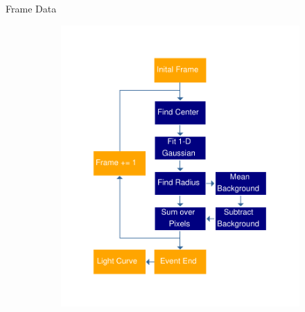 \documentclass[final]{beamer}
\newlength{\twocolwid}
\begin{document}
\begin{frame}[t]
\begin{columns}[t]
\begin{column}{\twocolwid}

\begin{alertblock}{Frame Data}

\begin{figure}
\centering
\begin{subfigure}{.5\textwidth}
  \centering
  \includegraphics[width=\linewidth]{flowchart4.pdf}
  \label{fig:sub1}
\end{subfigure}%
\begin{subfigure}{.5\textwidth}
  \centering

\end{subfigure}
\end{figure}
\end{alertblock}
\end{column}
\end{columns}
\end{frame}
\end{document}
